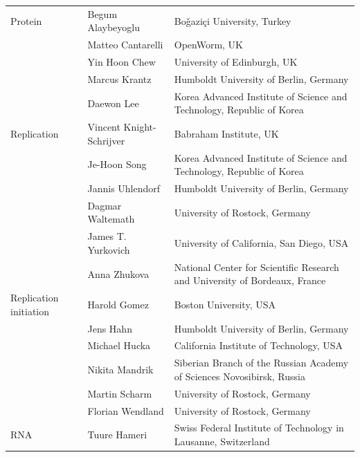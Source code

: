 \documentclass[journal,transmag]{IEEEtran}
\begin{document}
\begin{table}[ht!]
\begin{tabularx}{\textwidth}{llX}
\midrule
Protein                   & Begum Alaybeyoglu                & Bo\v{g}azi\c{c}i University, Turkey\\
                          & Matteo Cantarelli                & OpenWorm, UK\\
                          & Yin Hoon Chew                    & University of Edinburgh, UK\\
                          & Marcus Krantz                    & Humboldt University of Berlin, Germany\\
                          & Daewon Lee                       & Korea Advanced Institute of Science and Technology, Republic of Korea\\
\midrule
Replication               & Vincent Knight-Schrijver         & Babraham Institute, UK\\
                          & Je-Hoon Song                     & Korea Advanced Institute of Science and Technology, Republic of Korea\\
                          & Jannis Uhlendorf                 & Humboldt University of Berlin, Germany\\
                          & Dagmar Waltemath                 & University of Rostock, Germany\\
                          & James T. Yurkovich                  & University of California, San Diego, USA\\
                          & Anna Zhukova                     & National Center for Scientific Research and University of Bordeaux, France\\
\midrule
Replication initiation    & Harold Gomez                     & Boston University, USA\\
                          & Jens Hahn                        & Humboldt University of Berlin, Germany\\
                          & Michael Hucka                    & California Institute of Technology, USA\\
                          & Nikita Mandrik                   & Siberian Branch of the Russian Academy of Sciences Novosibirsk, Russia\\
                          & Martin Scharm                    & University of Rostock, Germany\\
                          & Florian Wendland                 & University of Rostock, Germany\\
\midrule
RNA                       & Tuure Hameri                     & Swiss Federal Institute of Technology in Lausanne, Switzerland\\

\end{tabularx}
\end{table}
\end{document}
